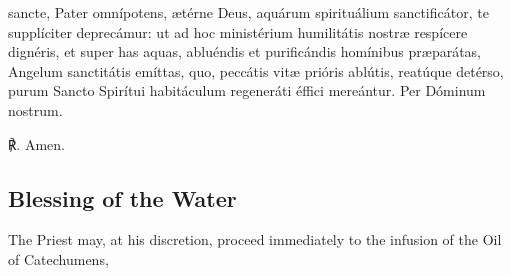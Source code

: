 {\oremuslatin

 sancte, Pater omnípotens, {\ae}térne Deus, aquárum spirituálium sanctificátor, te supplíciter deprecámur: ut ad hoc ministérium humilitátis nostr{\ae} respícere dignéris, et super has aquas, abluéndis et purificándis homínibus pr{\ae}parátas, Angelum sanctitátis emíttas, quo, peccátis vit{\ae} prióris ablútis, reatúque detérso, purum Sancto Spirítui habitáculum regeneráti éffici mereántur. Per Dóminum nostrum.\par
℟. Amen.}

\subsection{Blessing of the Water}

\begin{rubric}
	The Priest may, at his discretion, proceed immediately to the infusion of the Oil of Catechumens, 
\end{rubric}


